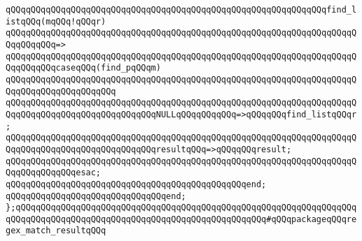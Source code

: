 \newline
\verb|qQQqqQQqqQQqqQQqqQQqqQQqqQQqqQQqqQQqqQQqqQQqqQQqqQQqqQQqqQQqqQQqfind_listqQQq(mqQQq!qQQqr)|\newline
\verb|qQQqqQQqqQQqqQQqqQQqqQQqqQQqqQQqqQQqqQQqqQQqqQQqqQQqqQQqqQQqqQQqqQQqqQQqqQQqqQQq=>|\newline
\verb|qQQqqQQqqQQqqQQqqQQqqQQqqQQqqQQqqQQqqQQqqQQqqQQqqQQqqQQqqQQqqQQqqQQqqQQqqQQqqQQqcaseqQQq(find_pqQQqm)|\newline
\verb|qQQqqQQqqQQqqQQqqQQqqQQqqQQqqQQqqQQqqQQqqQQqqQQqqQQqqQQqqQQqqQQqqQQqqQQqqQQqqQQqqQQqqQQqqQQq|\newline
\verb|qQQqqQQqqQQqqQQqqQQqqQQqqQQqqQQqqQQqqQQqqQQqqQQqqQQqqQQqqQQqqQQqqQQqqQQqqQQqqQQqqQQqqQQqqQQqqQQqqQQqNULLqQQqqQQqqQQq=>qQQqqQQqfind_listqQQqr;|\newline
\verb|qQQqqQQqqQQqqQQqqQQqqQQqqQQqqQQqqQQqqQQqqQQqqQQqqQQqqQQqqQQqqQQqqQQqqQQqqQQqqQQqqQQqqQQqqQQqqQQqqQQqresultqQQq=>qQQqqQQqresult;|\newline
\verb|qQQqqQQqqQQqqQQqqQQqqQQqqQQqqQQqqQQqqQQqqQQqqQQqqQQqqQQqqQQqqQQqqQQqqQQqqQQqqQQqqQQqesac;|\newline
\verb|qQQqqQQqqQQqqQQqqQQqqQQqqQQqqQQqqQQqqQQqqQQqqQQqend;|\newline
\verb|qQQqqQQqqQQqqQQqqQQqqQQqqQQqqQQqend;|\newline
\newline
\verb|};qQQqqQQqqQQqqQQqqQQqqQQqqQQqqQQqqQQqqQQqqQQqqQQqqQQqqQQqqQQqqQQqqQQqqQQqqQQqqQQqqQQqqQQqqQQqqQQqqQQqqQQqqQQqqQQqqQQqqQQq#qQQqpackageqQQqregex_match_resultqQQq|\newline
\newline
\newline


